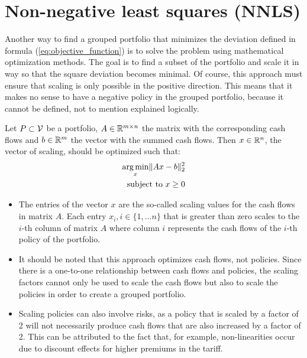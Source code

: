 

\chapter{Non-negative least squares (NNLS)}
\label{cha:NNLS}

Another way to find a grouped portfolio that minimizes the deviation defined in formula (\ref{eq:objective_function}) is to solve the problem using mathematical optimization methods. The goal is to find a subset of the portfolio and scale it in way so that the square deviation becomes minimal. Of course, this approach must ensure that scaling is only possible in the positive direction. This means that it makes no sense to have a negative policy in the grouped portfolio, because it cannot be defined, not to mention explained logically. 

\begin{definition}\label{def:NNLS}
	Let $P \subset \mathcal{V}$ be a portfolio, $A \in \mathbb{R}^{m \times n}$ the matrix with the corresponding cash flows and $b \in \mathbb{R}^m$ the vector with the summed cash flows. Then $x \in \mathbb{R}^n$, the vector of scaling, should be optimized such that:  
	\begin{equation}\label{eq:NNLS}
		\begin{aligned}
			\operatorname*{arg\,min}_x \lVert Ax -b \rVert_2^2 \\
			\text{subject to } x \geq 0
		\end{aligned}
	\end{equation}
\end{definition}

\begin{remark}
	\leavevmode %
	\makeatletter
	\@nobreaktrue
	\makeatother
	\begin{itemize}
		\item 	The entries of the vector $x$ are the so-called scaling values for the cash flows in matrix $A$. Each entry $x_i, i \in \{1,...n\}$ that is greater than zero scales to the $i$-th column of matrix $A$ where column $i$ represents the cash flows of the $i$-th policy of the portfolio.
		\item 	It should be noted that this approach optimizes cash flows, not policies. Since there is a one-to-one relationship between cash flows and policies, the scaling factors cannot only be used to scale the cash flows but also to scale the policies in order to create a grouped portfolio. 
		\item 	Scaling policies can also involve risks, as a policy that is scaled by a factor of 2 will not necessarily produce cash flows that are also increased by a factor of 2. This can be attributed to the fact that, for example, non-linearities occur due to discount effects for higher premiums in the tariff.
	\end{itemize}
\end{remark}

